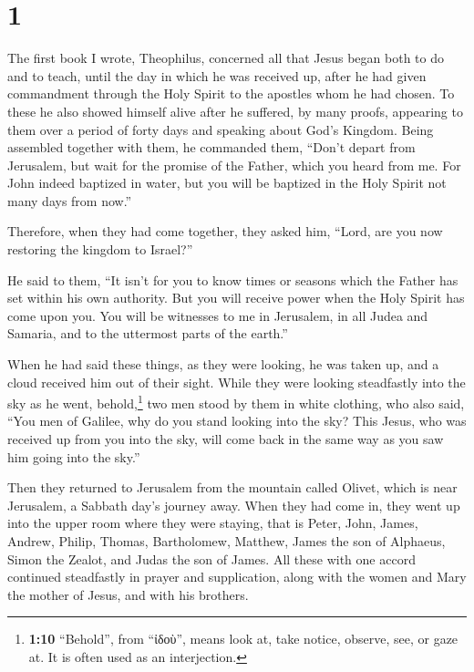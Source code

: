 \hypertarget{section}{%
\section{1}\label{section}}

 The first book I wrote, Theophilus, concerned all that
Jesus began both to do and to teach,  until the day in
which he was received up, after he had given commandment through the
Holy Spirit to the apostles whom he had chosen.  To these
he also showed himself alive after he suffered, by many proofs,
appearing to them over a period of forty days and speaking about God's
Kingdom.  Being assembled together with them, he commanded
them, ``Don't depart from Jerusalem, but wait for the promise of the
Father, which you heard from me.  For John indeed baptized
in water, but you will be baptized in the Holy Spirit not many days from
now.''

 Therefore, when they had come together, they asked him,
``Lord, are you now restoring the kingdom to Israel?''

 He said to them, ``It isn't for you to know times or
seasons which the Father has set within his own authority.
 But you will receive power when the Holy Spirit has come
upon you. You will be witnesses to me in Jerusalem, in all Judea and
Samaria, and to the uttermost parts of the earth.''

 When he had said these things, as they were looking, he
was taken up, and a cloud received him out of their sight.
 While they were looking steadfastly into the sky as he
went, behold,\footnote{\textbf{1:10} ``Behold'', from ``ἰδοὺ'', means
  look at, take notice, observe, see, or gaze at. It is often used as an
  interjection.} two men stood by them in white clothing,
 who also said, ``You men of Galilee, why do you stand
looking into the sky? This Jesus, who was received up from you into the
sky, will come back in the same way as you saw him going into the sky.''

 Then they returned to Jerusalem from the mountain called
Olivet, which is near Jerusalem, a Sabbath day's journey away.
 When they had come in, they went up into the upper room
where they were staying, that is Peter, John, James, Andrew, Philip,
Thomas, Bartholomew, Matthew, James the son of Alphaeus, Simon the
Zealot, and Judas the son of James.  All these with one
accord continued steadfastly in prayer and supplication, along with the
women and Mary the mother of Jesus, and with his brothers.

